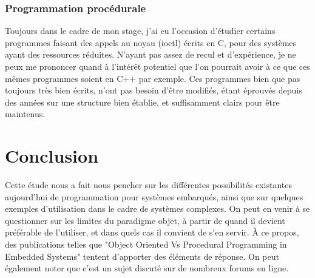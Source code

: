 \documentclass[12pt]{article} %
\begin{document}
\subsubsection{Programmation procédurale }
Toujours dans le cadre de mon stage, j'ai eu l'occasion d'étudier certains programmes faisant des appels au noyau (ioctl) écrits en C, pour des systèmes ayant des ressources réduites.
N'ayant pas assez de recul et d'expérience, je ne peux me prononcer quand à l'intérêt potentiel que l'on pourrait avoir à ce que ces mêmes programmes soient en C++ par exemple.
Ces programmes bien que pas toujours très bien écrits, n'ont pas besoin d'être modifiés, étant éprouvés depuis des années sur une structure bien établie, et suffisamment clairs pour être maintenus.
\newpage
\section{Conclusion}
Cette étude nous a fait nous pencher sur les différentes possibilités existantes aujourd'hui de programmation pour systèmes embarqués, ainsi que sur quelques exemples d'utilisation dans le cadre de systèmes complexes.
On peut en venir à se questionner sur les limites du paradigme objet, à partir de quand il devient préférable de l'utiliser, et dans quels cas il convient de s'en servir. À ce propos, des publications telles que "Object Oriented Vs Procedural Programming in Embedded Systems" \cite{OOPvsProcedural}tentent d'apporter des éléments de réponse. On peut également noter que c'est un sujet discuté sur de nombreux forums en ligne.

\newpage
\nocite{LightweightComponent}
\nocite{OOPvsProcedural}
\nocite{PlatformDesign}
\nocite{OOPEmbedded}

 

\end{document}
